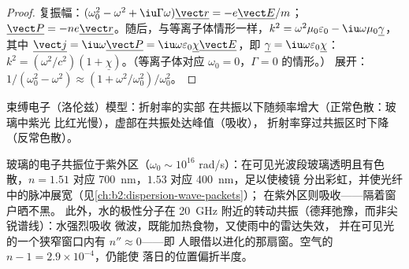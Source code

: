 \begin{proof}
复振幅：$(\omega_0^2 - \omega^2 + \iu\Gamma\omega)\underline{\vect r} = -e\underline{\vect E}
/m$；$\underline{\vect P} = -ne\underline{\vect r}$。随后，与等离子体情形一样，$k^2 = \omega^2\mu_0
\varepsilon_0 - \iu\omega\mu_0\underline\gamma$，其中 $\underline{\vect j} = \iu\omega\underline{\vect P} = \iu\omega\varepsilon_0
\underline\chi\underline{\vect E}$，即 $\underline\gamma = \iu\omega\varepsilon_0\underline\chi$：$k^2 = (\omega^2/c^2)
(1 + \underline\chi)$。（等离子体对应 $\omega_0 = 0$，$\Gamma = 0$ 的情形。）
展开：$1/(\omega_0^2 - \omega^2) \approx (1 + \omega^2/\omega_0^2)/\omega_0^2$。
\end{proof}

\begin{omfigure}

{\small 束缚电子（洛伦兹）模型：折射率的实部
在共振以下随频率增大（正常色散：玻璃中紫光
比红光慢），虚部在共振处达峰值（吸收），
折射率穿过共振区时下降
（反常色散）。}
\end{omfigure}

\begin{example}[玻璃、水、空气]\label{ex:b2:waves-in-media:dielectrics}
玻璃的电子共振位于紫外区（$\omega_0 \sim 10^{16}$
rad/s）：在可见光波段玻璃透明且有色散，$n = 1.51$ 对应
\qty{700}{nm}，$1.53$ 对应 \qty{400}{nm}，足以使棱镜
分出彩虹，并使光纤中的脉冲展宽（见\cref{ch:b2:dispersion-wave-packets}）；
在紫外区则吸收——隔着窗户晒不黑。
此外，水的极性分子在
\qty{20}{GHz} 附近的转动共振（德拜弛豫，而非尖锐谱线）：水强烈吸收
微波，既能加热食物，又使雨中的雷达失效，
并在可见光的一个狭窄窗口内有 $n'' \approx 0$——即
人眼借以进化的那扇窗。空气的 $n - 1 = 2.9 \times 10^{-4}$，仍能使
落日的位置偏折半度。
\end{example}

